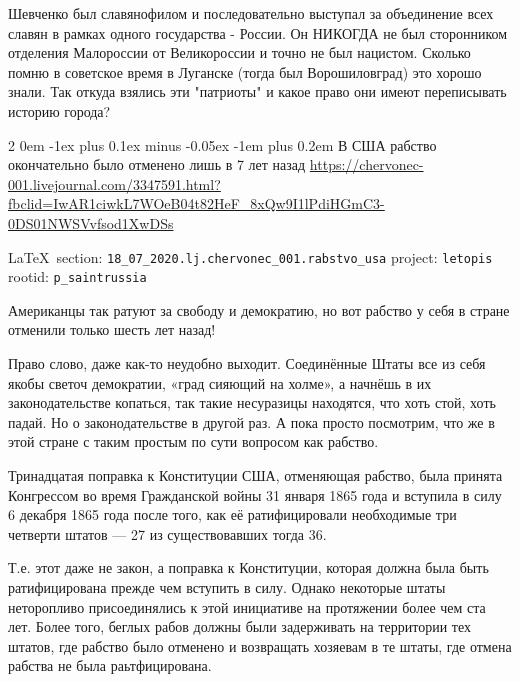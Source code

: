 \documentclass[a4paper,11pt]{extreport}
\makeatletter
\renewcommand\subsection{%
  \clearpage
    \@startsection{subsection}%
    {2}%
    {0em}%
    {-1ex plus 0.1ex minus -0.05ex}%
    {-1em plus 0.2em}%
    {\scshape\bfseries\Large}%
}
\makeatother
\begin{document}
Шевченко был славянофилом и последовательно выступал за объединение всех славян
в рамках одного государства - России. Он НИКОГДА не был сторонником отделения
Малороссии от Великороссии и точно не был нацистом.  Сколько помню в советское
время в Луганске (тогда был Ворошиловград) это хорошо знали. Так откуда взялись
эти "патриоты" и какое право они имеют переписывать историю города?
  

 
 
\subsection{В США рабство окончательно было отменено лишь в 7 лет назад}
\label{sec:18_07_2020.lj.chervonec_001.rabstvo_usa}
\url{https://chervonec-001.livejournal.com/3347591.html?fbclid=IwAR1ciwkL7WOeB04t82HeF_8xQw9I1lPdiHGmC3-0DS01NWSVvfsod1XwDSs}
  
\vspace{0.5cm}
{\small\LaTeX~section: \verb|18_07_2020.lj.chervonec_001.rabstvo_usa| project: \verb|letopis| rootid: \verb|p_saintrussia|}
\vspace{0.5cm}

Американцы так ратуют за свободу и демократию, но вот рабство у себя в стране
отменили только шесть лет назад!

Право слово, даже как-то неудобно выходит. Соединённые Штаты все из себя якобы
светоч демократии, «град сияющий на холме», а начнёшь в их законодательстве
копаться, так такие несуразицы находятся, что хоть стой, хоть падай. Но о
законодательстве в другой раз. А пока просто посмотрим, что же в этой стране с
таким простым по сути вопросом как рабство.

Тринадцатая поправка к Конституции США, отменяющая рабство, была принята
Конгрессом во время Гражданской войны 31 января 1865 года и вступила в силу 6
декабря 1865 года после того, как её ратифицировали необходимые три четверти
штатов --- 27 из существовавших тогда 36.

Т.е. этот даже не закон, а поправка к Конституции, которая должна была быть
ратифицирована прежде чем вступить в силу. Однако некоторые штаты неторопливо
присоединялись к этой инициативе на протяжении более чем ста лет. Более того,
беглых рабов должны были задерживать на территории тех штатов, где рабство было
отменено и возвращать хозяевам в те штаты, где отмена рабства не была
раьтфицирована.
\end{document}
